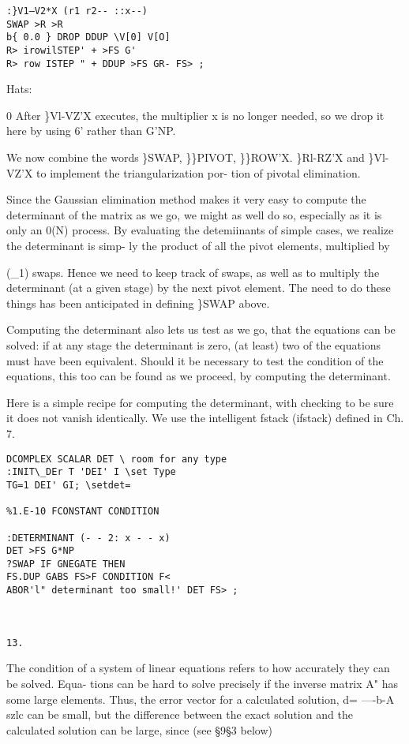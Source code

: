 {{{{{{{{{\begin{verbatim}
:}V1—V2*X (r1 r2-- ::x--)
SWAP >R >R
b{ 0.0 } DROP DDUP \V[0] V[O]
R> irowilSTEP' + >FS G'
R> row ISTEP " + DDUP >FS GR- FS> ;

\end{verbatim} 
Hats:

0 After \}Vl-VZ'X executes, the multiplier x is no longer needed,
so we drop it here by using 6' rather than G'NP.

We now combine the words \}SWAP, \}\}PIVOT, \}\}ROW'X.
\}Rl-RZ'X and \}Vl-VZ'X to implement the triangularization por-
tion of pivotal elimination.




Since the Gaussian elimination method makes it very easy to
compute the determinant of the matrix as we go, we might as well
do so, especially as it is only an 0(N) process. By evaluating the
detemiinants of simple cases, we realize the determinant is simp-
ly the product of all the pivot elements, multiplied by

(\_1) swaps. Hence we need to keep track of swaps, as well as to
multiply the determinant (at a given stage) by the next pivot
element. The need to do these things has been anticipated in
defining \}SWAP above.

Computing the determinant also lets us test as we go, that the
equations can be solved: if at any stage the determinant is zero,
(at least) two of the equations must have been equivalent. Should
it be necessary to test the condition of the equations, this too
can be found as we proceed, by computing the determinant.

Here is a simple recipe for computing the determinant, with
checking to be sure it does not vanish identically. We use the
intelligent fstack (ifstack) defined in Ch. 7.

\begin{verbatim}
DCOMPLEX SCALAR DET \ room for any type
:INIT\_DEr T 'DEI' I \set Type
TG=1 DEI' GI; \setdet=

%1.E-10 FCONSTANT CONDITION

:DETERMINANT (- - 2: x - - x)
DET >FS G*NP
?SWAP IF GNEGATE THEN
FS.DUP GABS FS>F CONDITION F<
ABOR'l" determinant too small!' DET FS> ;

 

13.
\end{verbatim} 

The condition of a system of linear equations refers to how accurately they can be solved. Equa-
tions can be hard to solve precisely if the inverse matrix A" has some large elements. Thus, the
error vector for a calculated solution, d= —-b-A szlc can be small, but the difference between the
exact solution and the calculated solution can be large, since (see \S9\S3 below)

}}}}}}}}}
